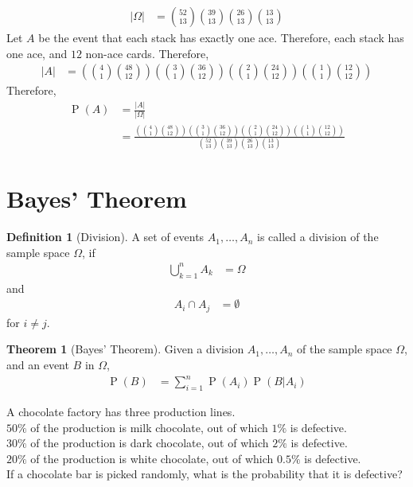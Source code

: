 \documentclass[titlepage, fleqn, a4paper, 12pt, twoside]{article}
\theoremstyle{definition}
\newtheorem{definition}{Definition}
\theoremstyle{theorem}
\newtheorem{theorem}{Theorem}
\DeclareMathOperator{\prob}{\mathrm{P}}
\begin{document}
\begin{solution}
	\begin{align*}
		|\Omega| & = \binom{52}{13} \binom{39}{13} \binom{26}{13} \binom{13}{13}
	\end{align*}
	Let $A$ be the event that each stack has exactly one ace.
	Therefore, each stack has one ace, and $12$ non-ace cards.
	Therefore, 
	\begin{align*}
		|A| & = \left( \binom{4}{1} \binom{48}{12} \right) \left( \binom{3}{1} \binom{36}{12} \right) \left( \binom{2}{1} \binom{24}{12} \right) \left( \binom{1}{1} \binom{12}{12} \right)
	\end{align*}
	Therefore,
	\begin{align*}
		\prob(A) & = \frac{|A|}{|\Omega|} \\
                         & = \frac{\left( \binom{4}{1} \binom{48}{12} \right) \left( \binom{3}{1} \binom{36}{12} \right) \left( \binom{2}{1} \binom{24}{12} \right) \left( \binom{1}{1} \binom{12}{12} \right)}{\binom{52}{13} \binom{39}{13} \binom{26}{13} \binom{13}{13}}
	\end{align*}
\end{solution}

\section{Bayes' Theorem}

\begin{definition}[Division]
	A set of events $A_1,\dots,A_n$ is called a division of the sample space $\Omega$, if
	\begin{align*}
		\bigcup\limits_{k = 1}^{n} A_k & = \Omega
	\end{align*}
	and
	\begin{align*}
		A_i \cap A_j & = \emptyset
	\end{align*}
	for $i \neq j$.
\end{definition}

\begin{theorem}[Bayes' Theorem]
	Given a division $A_1,\dots,A_n$ of the sample space $\Omega$, and an event $B$ in $\Omega$,
	\begin{align*}
		\prob(B) & = \sum\limits_{i = 1}^{n} \prob(A_i) \prob(B|A_i)
	\end{align*}
	\label{thm:Bayes_Theorem}
\end{theorem}

\begin{question}
	A chocolate factory has three production lines.\\
	$50\%$ of the production is milk chocolate, out of which $1\%$ is defective.\\
	$30\%$ of the production is dark chocolate, out of which $2\%$ is defective.\\
	$20\%$ of the production is white chocolate, out of which $0.5\%$ is defective.\\
	If a chocolate bar is picked randomly, what is the probability that it is defective?
\end{question}
\end{document}
